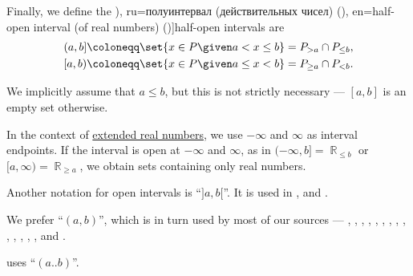 \begin{definition}
\begin{thmenum}
     Finally, we define the \term[bg=полузатворен интервал (\cite[39]{Тагамлицки1971ДиференциалноСмятане}), ru=полуинтервал (действительных чисел) (\cite[82]{Проскуряков1951ТеоретическиеОсновыАрифметики}), en=half-open interval (of real numbers) (\cite[def. 2.17]{Rudin1976AnalysisPrinciples})]{half-open intervals} are
    \begin{equation*}
      \begin{aligned}
        (a, b] \coloneqq \set{ x \in P \given a < x \leq b } = P_{> a} \cap P_{\leq b},
        \\
        [a, b) \coloneqq \set{ x \in P \given a \leq x < b } = P_{\geq a} \cap P_{< b}.
      \end{aligned}
    \end{equation*}
  \end{thmenum}
\end{definition}
\begin{comments}
  \item We implicitly assume that \( a \leq b \), but this is not strictly necessary --- \( [a, b] \) is an empty set otherwise.

  \item In the context of \hyperref[def:extended_real_numbers]{extended real numbers}, we use \( -\infty \) and \( \infty \) as interval endpoints. If the interval is open at \( -\infty \) and \( \infty \), as in \( (-\infty, b] = \BbbR_{\leq b} \) or \( [a, \infty) = \BbbR_{\geq a} \), we obtain sets containing only real numbers.

  \item Another notation for open intervals is \enquote{\( ]a, b[ \)}. It is used in
  \cite[147]{Bourbaki2004TheoryOfSets},
  \cite[def. 2.3]{EkelandTemam1976ConvexAnalysis} and
  \cite[51]{Зорич2019АнализЧасть1}.

  We prefer \enquote{\( (a, b) \)}, which is in turn used by most of our sources ---
  \cite[9]{Lorentz1966ApproximationOfFunctions},
  \cite[31]{Rudin1976AnalysisPrinciples},
  \cite[10]{Engelking1989GeneralTopology},
  \cite[269]{Jacobson1985BasicAlgebraI},
  \cite[157]{Grätzer2011LatticeTheory},
  \cite[def. 1.8.9]{Harzheim2005OrderedSets},
  \cite[\S 3.3.14]{Schechter1997AnalysisHandbook}
  \cite[11]{Folland1999RealAnalysis}
  \cite[25]{МагарилИльяевТихомиров2002ВыпуклыйАнализ},
  \cite[18]{ИльинСадовничийСендов1985АнализТом1},
  \cite[\S 22.2]{Тыртышников2007ЛинейнаяАлгебра},
  \cite[12]{Александров1977ОбщаяТопология},
  \cite[112]{Винберг2014КурсАлгебры},
  \cite[10]{БелоусовТкачёв2004ДискретнаяМатематика},
  \cite[23]{Гуров2013ТеорияРешёток},
  \cite[7]{Боянов2008ЧислениМетоди},
  \cite[225]{ГеновМиховскиМоллов1991Алгебра} and
  \cite[39]{Тагамлицки1971ДиференциалноСмятане}.

  \Textcite[36]{Knuth1997ArtVol1} uses \enquote{\( (a..b) \)}.
\end{comments}

